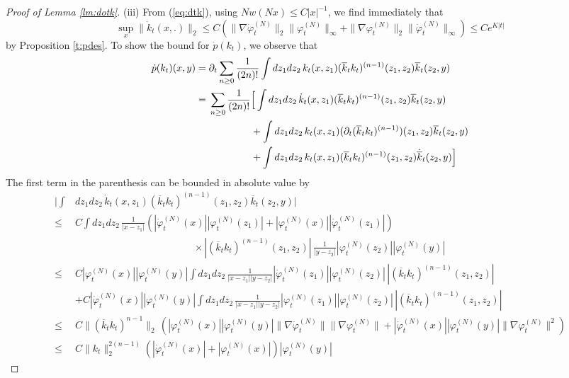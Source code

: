 \documentclass[11pt,a4paper]{article}
\newcommand{\ph}{\varphi_t^{(N)}}	%
\newcommand{\phdot}{\dot{\varphi}_t^{(N)}}	%
\begin{document}
\begin{proof}[Proof of Lemma \ref{lm:dotk}]
(iii)  {F}rom (\ref{eq:dtk}), using $N w(Nx) \leq C|x|^{-1}$, we find immediately that
\[ \sup_x \| \dot{k}_t (x,.) \|_2 \leq C \left(\| \nabla \phdot \|_2 \| \ph \|_\infty + \| \nabla \ph \|_2 \|\phdot\|_\infty \right) \leq C e^{K|t|} \]
by Proposition \ref{t:pdes}. To show the bound for $\dot{p} (k_t)$, we observe that
\begin{equation}\label{eq:px2} \begin{split}
\dot{p} (k_t) (x,y) = \; & \partial_t \sum_{n \geq 0}\frac{1}{(2n)!} \int dz_1 dz_2 \, k_t (x,z_1) (\overline{k}_t k_t)^{(n-1)} (z_1 ,z_2) \overline{k}_t (z_2 ,y ) \\ = \;& \sum_{n \geq 0}\frac{1}{(2n)!} \Big[  \int dz_1 dz_2 \, \dot{k}_t (x,z_1) (\overline{k}_t k_t)^{(n-1)} (z_1 ,z_2) \overline{k}_t (z_2 ,y ) \\ &\hspace{1.5cm} +
 \int dz_1 dz_2 \, k_t (x,z_1) (\partial_t (\overline{k}_t k_t)^{(n-1)}) (z_1 ,z_2) \overline{k}_t (z_2 ,y )\\
  &\hspace{1.5cm} + \int dz_1 dz_2 \, k_t (x,z_1) (\overline{k}_t k_t)^{(n-1)} (z_1 ,z_2) \dot{\overline{k}}_t (z_2 ,y ) \Big]  \end{split} \end{equation}
The first term in the parenthesis can be bounded in absolute value by
\[ \begin{split} 
\Big| \int &dz_1 dz_2 \, \dot{k}_t (x,z_1) (\overline{k}_t k_t)^{(n-1)} (z_1 ,z_2) \overline{k}_t (z_2 ,y ) \Big| \\ \leq \; &C \int dz_1 dz_2 \, \frac{1}{|x-z_1|} \left( |\phdot (x)| |\ph (z_1)|+ |\ph (x)| |\phdot (z_1)| \right)  \\ &\hspace{5cm} \times | (\overline{k}_t k_t)^{(n-1)} (z_1 ,z_2)| \, \frac{1}{|y-z_2|} |\ph (z_2)| |\ph (y)| \\
\leq \; &C |\ph (x)| |\ph (y)| \int dz_1 dz_2 \, \frac{1}{|x-z_1||y-z_2|} |\phdot (z_1)|  |\ph (z_2)| \,  | (\overline{k}_t k_t)^{(n-1)} (z_1 ,z_2)| \\
&+ C |\phdot (x)| |\ph (y)| \int dz_1 dz_2 \, \frac{1}{|x-z_1||y-z_2|} |\ph (z_1)|  |\ph (z_2)| \,  | (\overline{k}_t k_t)^{(n-1)} (z_1 ,z_2)| 
\\ \leq \; & C \| (\overline{k}_t k_t)^{n-1} \|_2  \, \left( |\ph (x)| |\ph (y)| \| \nabla \phdot \| \| \nabla \ph \| +   |\phdot (x)| |\ph (y)| \| \nabla \ph \|^2 \right)
\\ \leq \; & C \| k_t \|_2^{2(n-1)} (|\phdot (x)| + |\ph (x)|) |\ph (y)| 

\end{split}\]
\end{proof}
\end{document}
